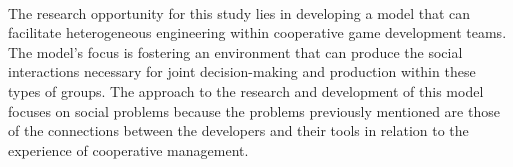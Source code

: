 \paragraph{} The research opportunity for this study lies in developing a model that can facilitate heterogeneous engineering within cooperative game development teams. The model's focus is fostering an environment that can produce the social interactions necessary for joint decision-making and production within these types of groups. The approach to the research and development of this model focuses on social problems because the problems previously mentioned are those of the connections between the developers and their tools in relation to the experience of cooperative management.